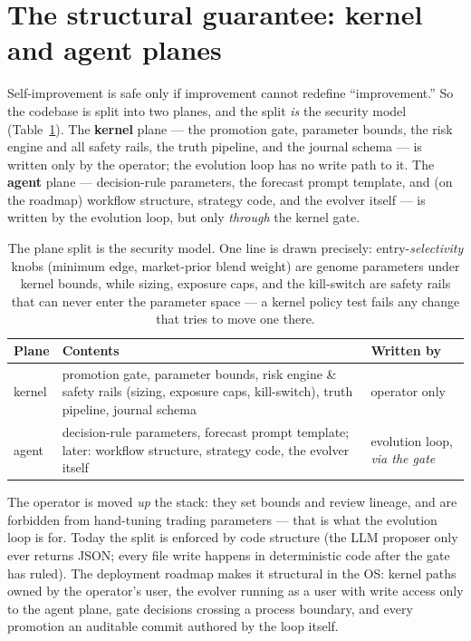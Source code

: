 \documentclass{article}
\begin{document}
\section{The structural guarantee: kernel and agent planes}
\label{sec:planes}

Self-improvement is safe only if improvement cannot redefine ``improvement.'' So
the codebase is split into two planes, and the split \emph{is} the security model
(Table~\ref{tab:planes}). The \textbf{kernel} plane --- the promotion gate,
parameter bounds, the risk engine and all safety rails, the truth pipeline, and
the journal schema --- is written only by the operator; the evolution loop has no
write path to it. The \textbf{agent} plane --- decision-rule parameters, the
forecast prompt template, and (on the roadmap) workflow structure, strategy code,
and the evolver itself --- is written by the evolution loop, but only
\emph{through} the kernel gate.

\begin{table}[t]
\centering
\small
\begin{tabular}{@{}p{1.5cm}p{8.4cm}p{2.4cm}@{}}
\toprule
\textbf{Plane} & \textbf{Contents} & \textbf{Written by} \\
\midrule
kernel & promotion gate, parameter bounds, risk engine \& safety rails (sizing, exposure caps, kill-switch), truth pipeline, journal schema & operator only \\
agent & decision-rule parameters, forecast prompt template; later: workflow structure, strategy code, the evolver itself & evolution loop, \emph{via the gate} \\
\bottomrule
\end{tabular}
\caption{The plane split is the security model. One line is drawn precisely:
entry-\emph{selectivity} knobs (minimum edge, market-prior blend weight) are
genome parameters under kernel bounds, while sizing, exposure caps, and the
kill-switch are safety rails that can never enter the parameter space --- a kernel
policy test fails any change that tries to move one there.}
\label{tab:planes}
\end{table}

The operator is moved \emph{up} the stack: they set bounds and review lineage,
and are forbidden from hand-tuning trading parameters --- that is what the
evolution loop is for. Today the split is enforced by code structure (the LLM
proposer only ever returns JSON; every file write happens in deterministic code
after the gate has ruled). The deployment roadmap makes it structural in the OS:
kernel paths owned by the operator's user, the evolver running as a user with
write access only to the agent plane, gate decisions crossing a process boundary,
and every promotion an auditable commit authored by the loop itself.
\end{document}
